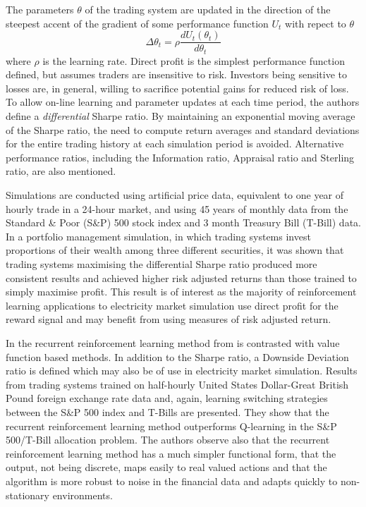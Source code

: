 The parameters $\theta$ of the trading system are updated in the direction of
the steepest accent of the gradient of some performance function $U_t$ with
repect to $\theta$
\begin{equation}
\Delta\theta_t = \rho \frac{dU_t(\theta_t)}{d\theta_t}
\end{equation}
where $\rho$ is the learning rate.  Direct profit is the simplest performance
function defined, but assumes traders are insensitive to risk.  Investors
being sensitive to losses are, in general, willing to sacrifice potential gains
for reduced risk of loss. To allow on-line learning and parameter updates at
each time period, the authors define a \textit{differential} Sharpe ratio.  By maintaining an
exponential moving average of the Sharpe ratio, the need to compute return
averages and standard deviations for the entire trading history at each
simulation period is avoided.  Alternative performance ratios, including the
Information ratio, Appraisal ratio and Sterling ratio, are also mentioned.

Simulations are conducted using artificial price data, equivalent to one year
of hourly trade in a 24-hour market, and using 45 years of monthly data from
the Standard \& Poor (S\&P) 500 stock index and 3 month Treasury Bill (T-Bill)
data. In a portfolio management simulation, in which trading systems invest
proportions of their wealth among three different securities, it was shown
that trading systems maximising the differential Sharpe ratio produced more
consistent results and achieved higher risk adjusted returns than those
trained to simply maximise profit.  This result is of interest as the majority
of reinforcement learning applications to electricity market simulation use
direct profit for the reward signal and may benefit from using measures of risk
adjusted return.

In \cite{moody:direct} the recurrent reinforcement learning method from
\cite{moody:98} is contrasted with value function based methods.  In addition
to the Sharpe ratio, a Downside Deviation ratio is defined which may also
be of use in electricity market simulation.  Results from trading
systems trained on half-hourly United States Dollar-Great British Pound foreign
exchange rate data and, again, learning switching strategies between the S\&P
500 index and T-Bills are presented.  They show that the recurrent
reinforcement learning method outperforms Q-learning in the S\&P
500/T-Bill allocation problem.  The authors observe also that the recurrent
reinforcement learning method has a much simpler functional form, that the
output, not being discrete, maps easily to real valued actions and that the
algorithm is more robust to noise in the financial data and adapts quickly to
non-stationary environments.

